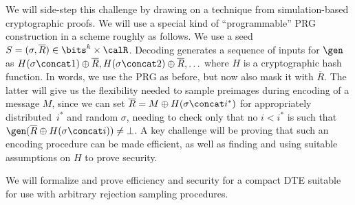 We will side-step this challenge by drawing on a technique from simulation-based
cryptographic proofs. We will use a special kind of ``programmable'' PRG
construction in a scheme roughly as follows.  We use a seed $S =
(\sigma,\overline{R}) \in \bits^k \times \calR$. Decoding generates a sequence
of inputs for $\gen$ as $H(\sigma \concat 1) \oplus \overline{R}, H(\sigma
\concat 2) \oplus \overline{R},\ldots$ where $H$ is a cryptographic hash
function. In words, we use the PRG as before, but now also mask it with
$\overline{R}$. The latter will give us the flexibility needed to sample
preimages during encoding of a message $M$, since we can set $\overline{R} = M
\oplus H(\sigma \concat i^*)$  for appropriately distributed~$i^*$ and random
$\sigma$, needing to check only that no $i < i^*$ is such that
$\gen(\overline{R}\oplus H(\sigma \concat i)) \ne \bot$. A key challenge will be
proving that such an encoding procedure can be made efficient, as well as
finding and using suitable assumptions on $H$ to prove security.


\begin{task}
\label{task:rej-samp}
We will formalize and prove efficiency and security for 
a compact DTE suitable for use with arbitrary rejection sampling procedures.
\end{task}

 
\iffalse
In this construction, a DTE seed $S = (\sigma, \mask)$, where $\sigma$ is a
PRNG seed and $\mask$ is a ``mask.'' In the {\sf decode} algorithm, a sequence
of integers $r_1 \oplus \mask, r_2 \oplus \mask, \ldots$ is generated, where
$r_j = \prng(\sigma, j)$ until a prime $\pi = r_i \oplus \mask$ is identified,
i.e., $\primetest(r_i \oplus \mask) = {\tt true}$. We refer to this as the {\em
seed sequence}.

The mask $\mask$ allows a seed $s$ to be ``cooked'' for a given input $\pi$ to
the {\sf encode} algorithm. Let $\gamma(i)$ denote the probability that the
first prime in a sequence of random $\ell$-bit integers appears in the $i^{th}$
position. By selecting the $\mask$ appropriately, we can meet two requirements:
(1) $\pi$ is assigned randomly to a position $i$ sampled from $\gamma$ and (2)
$\pi$ is the first prime in the seed sequence.

In the algorithm ${\sf encode}$, an index $i$ is sampled from $\gamma$ by
selecting trial random integers until a prime is found; counting the number of
such trials yields $i$. A seed $s = (\sigma, \mask)$ is then generated in which
$\pi$ is set to position $i$ according to requirement (1); this is done by
selecting $\sigma$ at random and letting $\mask = r_i \oplus \pi$. Of course,
it is possible then that $\pi$ is not the first prime in the seed sequence for
$s$, i.e., that requirement (2) is violated. In this case, the seed is rejected
and another generated. Such rejection sampling continues until requirement (2)
is met.
\fi


